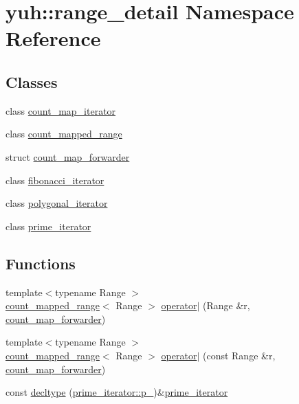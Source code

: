 \hypertarget{namespaceyuh_1_1range__detail}{\section{yuh\-:\-:range\-\_\-detail \-Namespace \-Reference}
\label{da/dda/namespaceyuh_1_1range__detail}
}
\subsection*{\-Classes}
\begin{DoxyCompactItemize}
\item 
class \hyperlink{classyuh_1_1range__detail_1_1count__map__iterator}{count\-\_\-map\-\_\-iterator}
\item 
class \hyperlink{classyuh_1_1range__detail_1_1count__mapped__range}{count\-\_\-mapped\-\_\-range}
\item 
struct \hyperlink{structyuh_1_1range__detail_1_1count__map__forwarder}{count\-\_\-map\-\_\-forwarder}
\item 
class \hyperlink{classyuh_1_1range__detail_1_1fibonacci__iterator}{fibonacci\-\_\-iterator}
\item 
class \hyperlink{classyuh_1_1range__detail_1_1polygonal__iterator}{polygonal\-\_\-iterator}
\item 
class \hyperlink{classyuh_1_1range__detail_1_1prime__iterator}{prime\-\_\-iterator}
\end{DoxyCompactItemize}
\subsection*{\-Functions}
\begin{DoxyCompactItemize}
\item 
{\footnotesize template$<$typename Range $>$ }\\\hyperlink{classyuh_1_1range__detail_1_1count__mapped__range}{count\-\_\-mapped\-\_\-range}$<$ \-Range $>$ \hyperlink{namespaceyuh_1_1range__detail_a128712717771a96265117e448135e6b8}{operator$|$} (\-Range \&r, \hyperlink{structyuh_1_1range__detail_1_1count__map__forwarder}{count\-\_\-map\-\_\-forwarder})
\item 
{\footnotesize template$<$typename Range $>$ }\\\hyperlink{classyuh_1_1range__detail_1_1count__mapped__range}{count\-\_\-mapped\-\_\-range}$<$ \-Range $>$ \hyperlink{namespaceyuh_1_1range__detail_abf270b3295a983c29653957120b0d172}{operator$|$} (const \-Range \&r, \hyperlink{structyuh_1_1range__detail_1_1count__map__forwarder}{count\-\_\-map\-\_\-forwarder})
\item 
const \hyperlink{namespaceyuh_1_1range__detail_ad56595bb0a2f86711343b5cb75e816f5}{decltype} (\hyperlink{classyuh_1_1range__detail_1_1prime__iterator_aff6d0a0fbc14123c0fca5a0c05d2e68c}{prime\-\_\-iterator\-::p\-\_\-})\&\hyperlink{classyuh_1_1range__detail_1_1prime__iterator}{prime\-\_\-iterator}
\end{DoxyCompactItemize}



